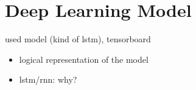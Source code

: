 \section{Deep Learning Model}
\label{sec:model}
used model (kind of lstm), tensorboard
\begin{itemize}
	\item logical representation of the model
	\item lstm/rnn: why?
\end{itemize}